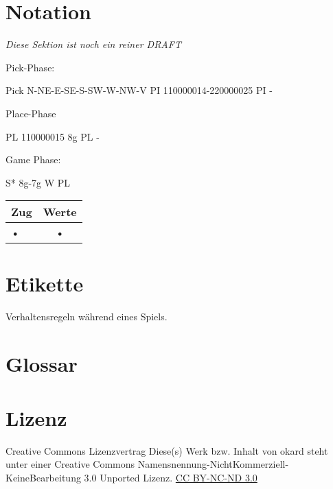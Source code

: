 \documentclass{article}
\begin{document}
\section{Notation}

\textit{Diese Sektion ist noch ein reiner DRAFT}


Pick-Phase:

Pick N-NE-E-SE-S-SW-W-NW-V
PI 110000014-220000025
PI - 

Place-Phase
 
PL 110000015 8g
PL -

Game Phase:

S* 8g-7g
W 
PL

\begin{tabular}{|l|c||}
\hline Zug & Werte \\ \hline
• & • \\  
\end{tabular} 


\section{Etikette}
	Verhaltensregeln während eines Spiels.
	
	

\section{Glossar}

\section{Lizenz}
Creative Commons Lizenzvertrag
Diese(s) Werk bzw. Inhalt von okard steht unter einer Creative Commons Namensnennung-NichtKommerziell-KeineBearbeitung 3.0 Unported Lizenz.
\href{http://creativecommons.org/licenses/by-nc-nd/3.0/}{CC BY-NC-ND 3.0}
\end{document}
